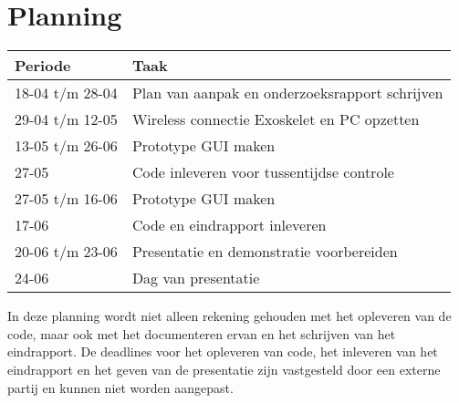 \section{Planning}
{\renewcommand{\arraystretch}{1.5}
\begin{tabular}{ | l | l | }
	\hline
	\bfseries{Periode} & \bfseries{Taak} \\ \hline
	18-04 t/m 28-04 & Plan van aanpak en onderzoeksrapport schrijven\\ \hline
	29-04 t/m 12-05 & Wireless connectie Exoskelet en PC opzetten   \\ \hline
	13-05 t/m 26-06 & Prototype GUI maken \\ \hline
	27-05 & Code inleveren voor tussentijdse controle \\ \hline 
	27-05 t/m 16-06 & Prototype GUI maken \\ \hline
	17-06 & Code en eindrapport inleveren \\ \hline
	20-06 t/m 23-06 & Presentatie en demonstratie voorbereiden \\ \hline
	24-06 & Dag van presentatie \\ \hline
\end{tabular}
}

In deze planning wordt niet alleen rekening gehouden met het opleveren van de code, maar ook met het documenteren ervan en het schrijven van het eindrapport. De deadlines voor het opleveren van code, het inleveren van het eindrapport en het geven van de presentatie zijn vastgesteld door een externe partij en kunnen niet worden aangepast.

